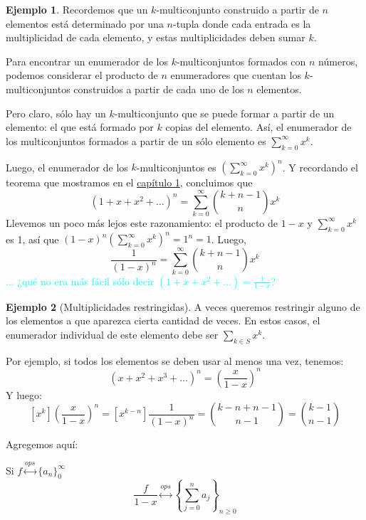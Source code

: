 \documentclass[spanish]{book}
\theoremstyle{definition}
\newtheorem*{ejem}{Ejemplo}
\begin{document}
\begin{ejem}
	Recordemos que un $k$-multiconjunto construido a partir de $n$ elementos está determinado por una $n$-tupla donde cada entrada es la multiplicidad de cada elemento, y estas multiplicidades deben sumar $k$. 
	
	Para encontrar un enumerador de los $k$-multiconjuntos formados con $n$ números, podemos considerar el producto de $n$ enumeradores que cuentan los $k$-multiconjuntos construidos a partir de cada uno de los $n$ elementos.
	
	Pero claro, sólo hay un $k$-multiconjunto que se puede formar a partir de un elemento: el que está formado por $k$ copias del elemento. Así, el enumerador de los multiconjuntos formados a partir de un sólo elemento es $\sum_{k=0}^\infty x^k$.
	
	Luego, el enumerador de los $k$-multiconjuntos es $\left(\sum_{k=0}^\infty x^k\right)^n$. Y recordando el teorema que mostramos en el \hyperref[chap:set-multiset]{capítulo 1}, concluimos que
	\[(1+x+x^2+\ldots)^n=\sum_{k=0}^\infty {k+n-1\choose n}x^k\]
	Llevemos un poco más lejos este razonamiento: el producto de $1-x$ y $\sum_{k=0}^\infty x^k$ es 1, así que $(1-x)^n\left(\sum_{k=0}^\infty x^k\right)^n=1^n=1$. Luego,
	\[\frac{1}{(1-x)^n}=\sum_{k=0}^\infty {k+n-1\choose n}x^k\]
	\textcolor{cyan}{... ¿qué no era más fácil sólo decir $(1+x+x^2+\ldots)=\frac{1}{1-x}$?}
\end{ejem}
\begin{ejem}[Multiplicidades restringidas]\label{restr}
	A veces queremos restringir alguno de los elementos a que aparezca cierta cantidad de veces. En estos casos, el enumerador individual de este elemento debe ser $\sum_{k\in S}x^k$.
	
	Por ejemplo, si todos los elementos se deben usar al menos una vez, tenemos:
	\[(x+x^2+x^3+\ldots)^n=\left(\frac{x}{1-x}\right)^n\]
	Y luego:
	\[[x^k]\left(\frac{x}{1-x}\right)^n=[x^{k-n}]\frac{1}{(1-x)^n}={k-n+n-1\choose n-1}={k-1\choose n-1}\]
\end{ejem}
Agregemos aquí:
\begin{teo}[Regla 5]\label{rule5}
	Si $f\overset{ops}{\longleftrightarrow}\{a_n\}_0^\infty$  \[\frac{f}{1-x}\overset{ops}{\longleftrightarrow}\left\{\sum_{j=0}^na_j\right\}_{n\geq0}\]
\end{teo}
\end{document}
